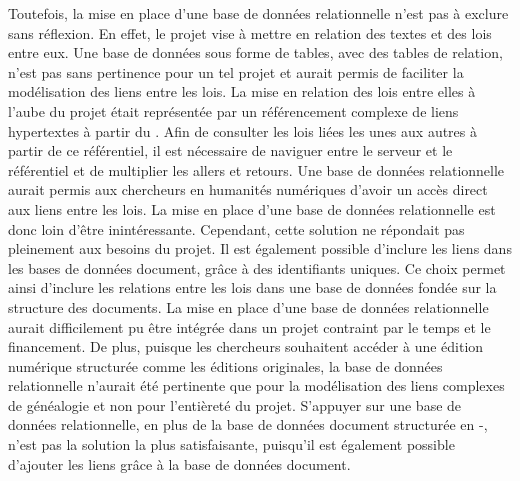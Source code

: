 Toutefois, la mise en place d'une base de données relationnelle n'est pas à exclure sans réflexion. En effet, le projet \COREL vise à mettre en relation des textes et des lois entre eux. Une base de données sous forme de tables, avec des tables de relation, n'est pas sans pertinence pour un tel projet et aurait permis de faciliter la modélisation des liens entre les lois. La mise en relation des lois entre elles à l'aube du projet était représentée par un référencement complexe de liens hypertextes à partir du \genyuan. Afin de consulter les lois liées les unes aux autres à partir de ce référentiel, il est nécessaire de naviguer entre le serveur \IIIF et le référentiel et de multiplier les allers et retours. Une base de données relationnelle aurait permis aux chercheurs en humanités numériques d'avoir un accès direct aux liens entre les lois. La mise en place d'une base de données relationnelle est donc loin d'être inintéressante. Cependant, cette solution ne répondait pas pleinement aux besoins du projet. Il est également possible d'inclure les liens dans les bases de données document, grâce à des identifiants uniques. Ce choix permet ainsi d'inclure les relations entre les lois dans une base de données fondée sur la structure des documents. La mise en place d'une base de données relationnelle aurait difficilement pu être intégrée dans un projet contraint par le temps et le financement. De plus, puisque les chercheurs souhaitent accéder à une édition numérique structurée comme les éditions originales, la base de données relationnelle n'aurait été pertinente que pour la modélisation des liens complexes de généalogie et non pour l'entièreté du projet. S'appuyer sur une base de données relationnelle, en plus de la base de données document structurée en \XML-\TEI, n'est pas la solution la plus satisfaisante, puisqu'il est également possible d'ajouter les liens grâce à la base de données document. 

